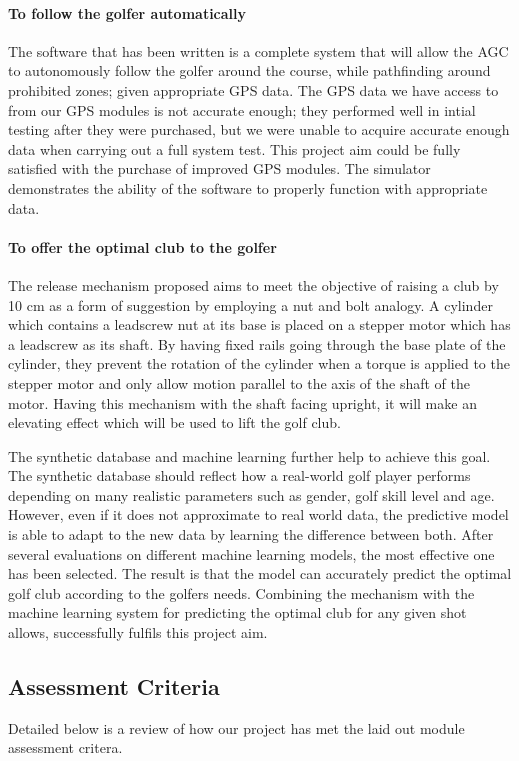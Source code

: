 \documentclass[11pt,landscape]{article}
\begin{document}
\begin{multicols}{3}
\paragraph{To follow the golfer automatically}
The software that has been written is a complete system that will allow the AGC
to autonomously follow the golfer around the course, while pathfinding around
prohibited zones; given appropriate GPS data. The GPS data we have access to
from our GPS modules is not accurate enough; they performed well in intial
testing after they were purchased, but we were unable to acquire accurate enough
data when carrying out a full system test. This project aim could be fully
satisfied with the purchase of improved GPS modules. The simulator demonstrates
the ability of the software to properly function with appropriate data.

\paragraph{To offer the optimal club to the golfer}
The release mechanism proposed aims to meet the objective of raising a club by
10 cm as a form of suggestion by employing a nut and bolt analogy. A cylinder
which contains a leadscrew nut at its base is placed on a stepper motor which
has a leadscrew as its shaft. By having fixed rails going through the base plate
of the cylinder, they prevent the rotation of the cylinder when a torque is
applied to the stepper motor and only allow motion parallel to the axis of the
shaft of the motor. Having this mechanism with the shaft facing upright, it will
make an elevating effect which will be used to lift the golf club.

The synthetic database and machine learning further help to achieve this goal.
The synthetic database should reflect how a real-world golf player performs
depending on many realistic parameters such as gender, golf skill level and age.
However, even if it does not approximate to real world data, the predictive
model is able to adapt to the new data by learning the difference between both.
After several evaluations on different machine learning models, the most
effective one has been selected. The result is that the model can accurately
predict the optimal golf club according to the golfers needs. Combining the
mechanism with the machine learning system for predicting the optimal club for
any given shot allows, successfully fulfils this project aim.


\subsection{Assessment Criteria}
Detailed below is a review of how our project has met the laid out module
assessment critera.

\end{multicols}
\end{document}
